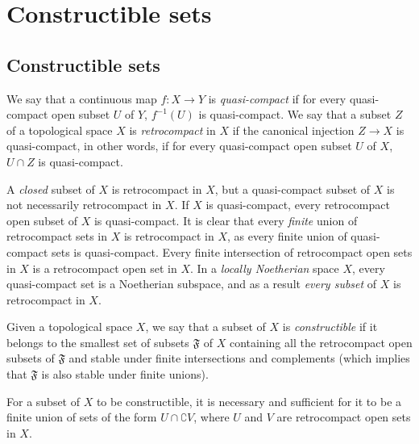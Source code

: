 \section{Constructible sets}
\label{section:0.9}

\subsection{Constructible sets}
\label{subsection:0.9.1}

\begin{definition}[9.1.1]
\label{0.9.1.1}
We say that a continuous map $f:X\to Y$ is \emph{quasi-compact} if for every quasi-compact open subset $U$ of $Y$, $f^{-1}(U)$ is quasi-compact.
We say that a subset $Z$ of a topological space $X$ is \emph{retrocompact} in $X$ if the canonical injection $Z\to X$ is quasi-compact, in other words, if for every quasi-compact open subset $U$ of $X$, $U\cap Z$ is quasi-compact.
\end{definition}

A \emph{closed} subset of $X$ is retrocompact in $X$, but a quasi-compact subset of $X$ is not necessarily retrocompact in $X$.
If $X$ is quasi-compact, every retrocompact open subset of $X$ is quasi-compact.
It is clear that every \emph{finite} union of retrocompact sets in $X$ is retrocompact in $X$, as every finite union of quasi-compact sets is quasi-compact.
Every finite intersection of retrocompact open sets in $X$ is a retrocompact open set in $X$.
In a \emph{locally Noetherian} space $X$, every quasi-compact set is a Noetherian subspace, and as a result \emph{every subset} of $X$ is retrocompact in $X$.

\begin{definition}[9.1.2]
\label{0.9.1.2}
Given a topological space $X$, we say that a subset of $X$ is \emph{constructible} if it belongs to the smallest set of subsets $\mathfrak{F}$ of $X$ containing all the retrocompact open subsets of $\mathfrak{F}$ and stable under finite intersections and complements (which implies that $\mathfrak{F}$ is also stable under finite unions).
\end{definition}

\begin{proposition}[9.1.3]
\label{0.9.1.3}
For a subset of $X$ to be constructible, it is necessary and sufficient for it to be a finite union of sets of the form $U\cap\complement{V}$, where $U$ and $V$ are retrocompact open sets in $X$.
\end{proposition}

